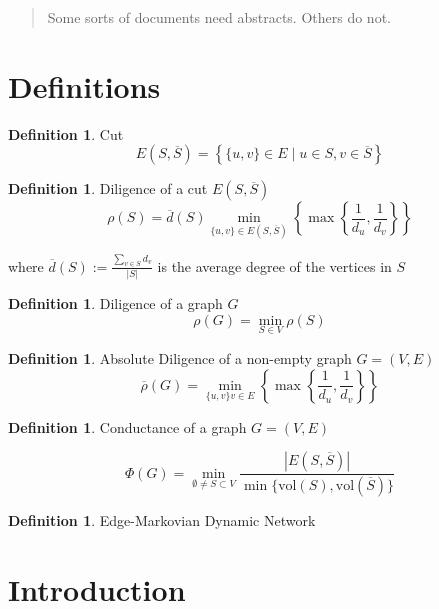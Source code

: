 \documentclass[a4paper,11pt]{article}
\theoremstyle{definition}
\newtheorem{definition}[theorem]{Definition}
\newcommand*\comp[1]{\overline{#1}}
\begin{document}



\begin{abstract}
	Some sorts of documents need abstracts. Others do not.
\end{abstract}
	
	
\tableofcontents

\section{Definitions}


\begin{definition}
	Cut
	$$
		E(S, \comp{S}) = \left\{\{u, v\} \in E \mid u \in S, v \in \comp{S} \right\}
	$$
\end{definition}

\begin{definition}
	Diligence of a cut $ E(S, \comp{S}) $
	$$
		\rho(S) = \comp{d}(S) \min_{\{u, v\} \in E(S, \comp{S}) } \left\{ \max \left\{ \frac{1}{d_u},\frac{1}{d_v} \right\} \right\}
	$$ 

	where $\comp{d}(S) := \frac{\sum_{v \in S} d_v}{|S|}$ is the average degree of the vertices in $S$
\end{definition}

\begin{definition}
	Diligence of a graph $G$
	$$
		\rho(G) = \min_{S \in V} \rho(S) 
	$$
\end{definition}

\begin{definition}
	Absolute Diligence of a non-empty graph $G = (V, E)$
	$$
		\comp{\rho}(G) = \min_{\{u, v\}v \in E}\left\{ \max \left\{ \frac{1}{d_u},\frac{1}{d_v} \right\} \right\}
	$$
\end{definition}

\begin{definition}
	Conductance of a graph $G = (V, E)$

	$$
		\Phi(G) = \min_{\emptyset \neq S \subset V} \frac{|E(S, \comp{S})|}{\min\{\text{vol}(S), \text{vol}(\comp{S})\}}
	$$
\end{definition}

\begin{definition}
	Edge-Markovian Dynamic Network

\end{definition}

\section{Introduction}
\end{document}
